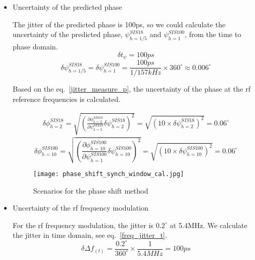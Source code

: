 \begin{itemize}
\item Uncertainty of the predicted phase

The jitter of the predicted phase is 100ps, so we could calculate the uncertainty of the predicted phase, $\psi_{h=1/5}^{SIS18}$ and $\psi_{h=1}^{SIS100}$, from the time to phase domain. 
\begin{equation} 
\delta t_\psi= 100ps
\label{jitter_measure_t}
\end{equation}
\begin{equation} 
\delta \psi_{h=1/5}^{SIS18}=\delta\psi_{h=1}^{SIS100}=
\frac {100ps}{1/157kHz} \times {360^{\circ}}\approx 0.006^\circ
\label{jitter_measure_p}
\end{equation}
 
Based on the eq.~\ref{jitter_measure_p}, the uncertainty of the phase at the rf reference frequencies is calculated. 

\begin{equation}
\begin{aligned}
\delta \phi_{h=2}^{SIS18} = \sqrt {(\frac{\partial \phi_{h=2}^{SIS18}}{\partial \psi_{h=2}^{SIS18}} \delta \psi_{h=2}^{SIS18})^2}=\sqrt {(10 \times \delta \psi_{h=2}^{SIS18})^2}=0.06^\circ
\label{phi_jitter1}
\end{aligned}
\end{equation}
\begin{equation}
\delta \phi_{h=10}^{SIS100} = \sqrt {(\frac{\partial \phi_{h=10}^{SIS100}}{\partial \psi_{h=1}^{SIS100}} \delta \psi_{h=10}^{SIS100})^2}=\sqrt {(10 \times \delta \psi_{h=10}^{SIS100})^2}=0.06^\circ
\label{phi_jitter2}
\end{equation}


\begin{figure}[!htb]
   \centering   
   \texttt{[image: phase\_shift\_synch\_window\_cal.jpg]}
   \caption{Scenarios for the phase shift method}
   \label{phase_shift}
\end{figure}
\item Uncertainty of the rf frequency modulation

For the rf frequency modulation, the jitter is $0.2^\circ$ at 5.4MHz. We calculate the jitter in time domain, see eq.~\ref{freq_jitter_t}.
\begin{equation}
\delta \Delta f_{(t)} = \frac{0.2^\circ}{360^\circ} \times {\frac{1}{5.4MHz}}=100ps
\label{freq_jitter_t}
\end{equation}
%



\end{itemize}
